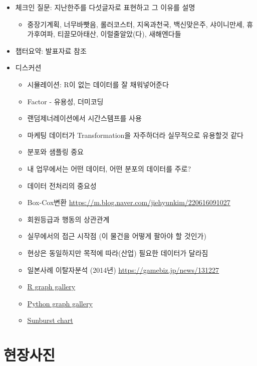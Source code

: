 \documentclass[
]{book}
\providecommand{\tightlist}{%
  \setlength{\itemsep}{0pt}\setlength{\parskip}{0pt}}
\begin{document}
\begin{itemize}
\tightlist
\item
  체크인 질문: 지난한주를 다섯글자로 표현하고 그 이유를 설명

  \begin{itemize}
  \tightlist
  \item
    중장기계획, 너무바빳음, 롤러코스터, 지옥과천국, 백신맞은주, 샤이니만세, 휴가후여파, 티끌모아태산, 이럴줄알았(다), 새해엔다들
  \end{itemize}
\item
  챕터요약: 발표자료 참조
\item
  디스커션

  \begin{itemize}
  \tightlist
  \item
    시뮬레이션: R이 없는 데이터를 잘 채워넣어준다
  \item
    Factor - 유용성, 더미코딩
  \item
    랜덤제너레이션에서 시간스템프를 사용
  \item
    마케팅 데이터가 Transformation을 자주하더라 실무적으로 유용할것 같다
  \item
    분포와 샘플링 중요
  \item
    내 업무에서는 어떤 데이터, 어떤 분포의 데이터를 주로?
  \item
    데이터 전처리의 중요성
  \item
    Box-Cox변환 \url{https://m.blog.naver.com/jiehyunkim/220616091027}
  \item
    회원등급과 행동의 상관관계
  \item
    실무에서의 접근 시작점 (이 물건을 어떻게 팔아야 할 것인가)
  \item
    현상은 동일하지만 목적에 따라(산업) 필요한 데이터가 달라짐
  \item
    일본사례 이탈자분석 (2014년) \url{https://gamebiz.jp/news/131227}
  \item
    \href{https://www.r-graph-gallery.com/}{R graph gallery}
  \item
    \href{https://www.python-graph-gallery.com/}{Python graph gallery}
  \item
    \href{https://plotly.com/r/sunburst-charts/}{Sunburst chart}
  \end{itemize}
\end{itemize}

\hypertarget{uxd604uxc7a5uxc0acuxc9c4-1}{%
\section{현장사진}\label{uxd604uxc7a5uxc0acuxc9c4-1}}
\end{document}
